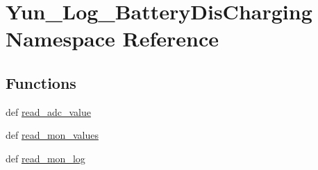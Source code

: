 \hypertarget{namespaceYun__Log__BatteryDisCharging}{\section{Yun\-\_\-\-Log\-\_\-\-Battery\-Dis\-Charging Namespace Reference}
\label{namespaceYun__Log__BatteryDisCharging}
}
\subsection*{Functions}
\begin{DoxyCompactItemize}
\item 
def \hyperlink{namespaceYun__Log__BatteryDisCharging_aabec52f6afb110e9030c41c37b5936a3}{read\-\_\-adc\-\_\-value}
\item 
def \hyperlink{namespaceYun__Log__BatteryDisCharging_a3a6547d581b469aa63fade6254839685}{read\-\_\-mon\-\_\-values}
\item 
def \hyperlink{namespaceYun__Log__BatteryDisCharging_a59735a004f2f37075365175ecf03ef5c}{read\-\_\-mon\-\_\-log}
\end{DoxyCompactItemize}
